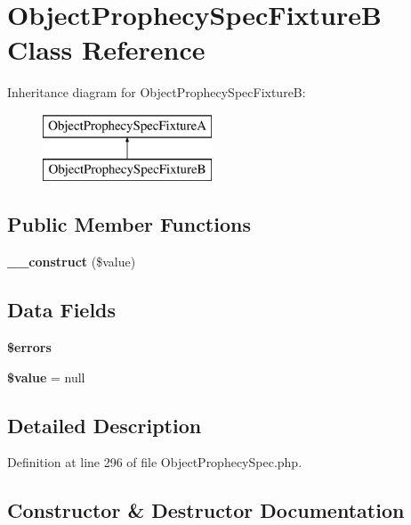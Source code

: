 \section{Object\+Prophecy\+Spec\+Fixture\+B Class Reference}
\label{classspec_1_1_prophecy_1_1_prophecy_1_1_object_prophecy_spec_fixture_b}
Inheritance diagram for Object\+Prophecy\+Spec\+Fixture\+B\+:\begin{figure}[H]
\begin{center}
\leavevmode
\includegraphics[height=2.000000cm]{classspec_1_1_prophecy_1_1_prophecy_1_1_object_prophecy_spec_fixture_b}
\end{center}
\end{figure}
\subsection*{Public Member Functions}
\begin{DoxyCompactItemize}
\item 
{\bf \+\_\+\+\_\+construct} (\$value)
\end{DoxyCompactItemize}
\subsection*{Data Fields}
\begin{DoxyCompactItemize}
\item 
{\bf \$errors}
\item 
{\bf \$value} = null
\end{DoxyCompactItemize}


\subsection{Detailed Description}


Definition at line 296 of file Object\+Prophecy\+Spec.\+php.



\subsection{Constructor \& Destructor Documentation}
